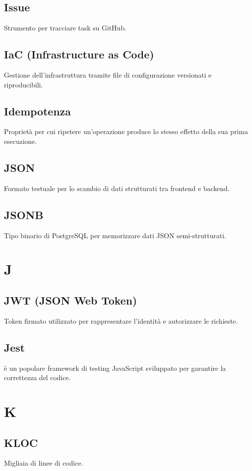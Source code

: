 \documentclass[a4paper,12pt]{article}
\begin{document}
\subsection{Issue}
Strumento per tracciare task su GitHub.

\subsection{IaC (Infrastructure as Code)}
Gestione dell'infrastruttura tramite file di configurazione versionati e riproducibili.

\subsection{Idempotenza}
Proprietà per cui ripetere un'operazione produce lo stesso effetto della sua prima esecuzione.

\subsection{JSON}
Formato testuale per lo scambio di dati strutturati tra frontend e backend.

\subsection{JSONB}
Tipo binario di PostgreSQL per memorizzare dati JSON semi-strutturati.

\section{J}
\subsection{JWT (JSON Web Token)}
Token firmato utilizzato per rappresentare l'identità e autorizzare le richieste.

\subsection{Jest}
 è un popolare framework di testing JavaScript sviluppato per garantire la correttezza del codice.

\section{K}
\subsection{KLOC}
Migliaia di linee di codice.
\end{document}
